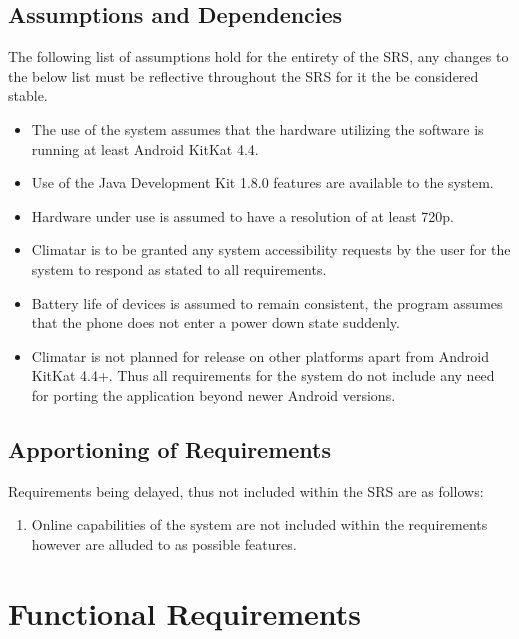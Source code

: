 \documentclass[]{article}
\begin{document}
\subsection{Assumptions and Dependencies}
\label{sub:assumptions_and_dependencies}
The following list of assumptions hold for the entirety of the SRS, any changes to the below list must be reflective throughout the SRS for it the be considered stable.
\begin{itemize}
	\item The use of the system assumes that the hardware utilizing the software is running at least Android KitKat 4.4.
	\item Use of the Java Development Kit 1.8.0 features are available to the system.
	\item Hardware under use is assumed to have a resolution of at least 720p.
	\item Climatar is to be granted any system accessibility requests by the user for the system to respond as stated to all requirements.
	\item Battery life of devices is assumed to remain consistent, the program assumes that the phone does not enter a power down state suddenly.
	\item Climatar is not planned for release on other platforms apart from Android KitKat 4.4+. Thus all requirements for the system do not include any need for porting the application beyond newer Android versions.
\end{itemize}

\subsection{Apportioning of Requirements}
\label{sub:apportioning_of_requirements}
Requirements being delayed, thus not included within the SRS are as follows:
\begin{enumerate}
	\item Online capabilities of the system are not included within the requirements however are alluded to as possible features.
\end{enumerate}



\section{Functional Requirements}
\label{sec:functional_requirements}
\end{document}
